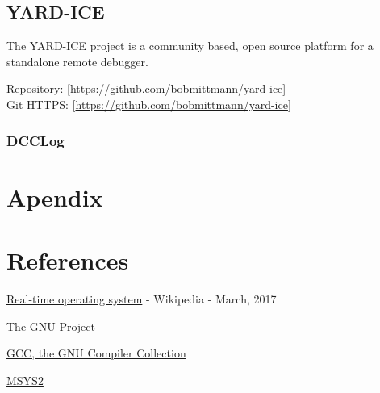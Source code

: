 \subsection{YARD-ICE}

The YARD-ICE project is a community based, open source platform for a standalone remote debugger.

\begin{flushleft}
Repository: [\href{https://github.com/bobmittmann/yard-ice}{https://github.com/bobmittmann/yard-ice}]\\
Git HTTPS: [\href{https://github.com/bobmittmann/yard-ice.git}{https://github.com/bobmittmann/yard-ice}]
\end{flushleft}

\subsubsection{DCCLog}

\section{Apendix}

\section {References}


\begin{flushleft}
\href{https://en.wikipedia.org/wiki/Real-time_operating_system}{Real-time operating system} - Wikipedia - March, 2017
\end{flushleft}

\begin{flushleft}
\href{https://www.gnu.org/gnu/thegnuproject.en.html}{The GNU Project}\\
\end{flushleft}

\begin{flushleft}
\href{https://gcc.gnu.org/}{GCC, the GNU Compiler Collection}\\
\end{flushleft}

\begin{flushleft}
\href{https://github.com/msys2/msys2/wiki}{MSYS2}\\
\end{flushleft}



